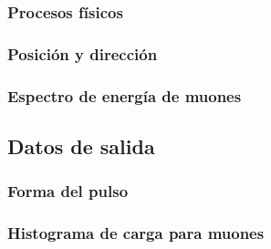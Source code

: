 \documentclass{book}
\begin{document}
\subsubsection{Procesos f\'isicos}
\subsubsection{Posici\'on y direcci\'on}
\subsubsection{Espectro de energ\'ia de muones}

\subsection{Datos de salida}
\subsubsection{Forma del pulso}
\subsubsection{Histograma de carga para muones}




\end{document}
